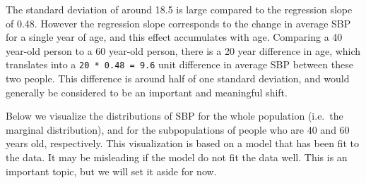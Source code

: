 \documentclass[11pt]{article}
\begin{document}
    The standard deviation of around 18.5 is large compared to the
regression slope of 0.48. However the regression slope corresponds to
the change in average SBP for a single year of age, and this effect
accumulates with age. Comparing a 40 year-old person to a 60 year-old
person, there is a 20 year difference in age, which translates into a
\texttt{20\ *\ 0.48\ =\ 9.6} unit difference in average SBP between
these two people. This difference is around half of one standard
deviation, and would generally be considered to be an important and
meaningful shift.

    Below we visualize the distributions of SBP for the whole population
(i.e.~the marginal distribution), and for the subpopulations of people
who are 40 and 60 years old, respectively. This visualization is based
on a model that has been fit to the data. It may be misleading if the
model do not fit the data well. This is an important topic, but we will
set it aside for now.
\end{document}
